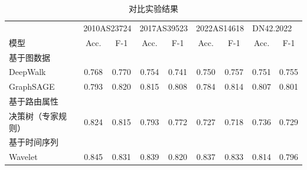 \begin{table}
    \caption{对比实验结果}
    \begin{tabular}{lcccccccc}
        \toprule
                        & \multicolumn{2}{l}{2010AS23724} & \multicolumn{2}{l}{2017AS39523} & \multicolumn{2}{l}{2022AS14618} & \multicolumn{2}{l}{DN42.2022}                                                                     \\ \cmidrule(lr){2-3} \cmidrule(lr){4-5} \cmidrule(lr){6-7} \cmidrule(lr){8-9}
        模型              & Acc.                            & F-1                             & Acc.                            & F-1                           & Acc.           & F-1            & Acc.           & F-1            \\ \midrule
        基于图数据                                                                                                                                                                                                                     \\
        \quad DeepWalk  & 0.768                           & 0.770                           & 0.754                           & 0.741                         & 0.750          & 0.757          & 0.751          & 0.755          \\
        \quad GraphSAGE & 0.793                           & 0.820                           & 0.815                           & 0.808                         & 0.784          & 0.814          & 0.807          & 0.801          \\
        \midrule
        基于路由属性                                                                                                                                                                                                                    \\
        \quad 决策树（专家规则） & 0.824                           & 0.815                           & 0.793                           & 0.772                         & 0.727          & 0.718          & 0.736          & 0.729          \\
        \midrule
        基于时间序列                                                                                                                                                                                                                    \\
        \quad Wavelet   & 0.845                           & 0.831                           & 0.839                           & 0.820                         & 0.837          & 0.833          & 0.814          & 0.796          \\

\end{tabular}
\end{table}
